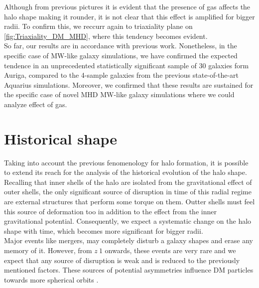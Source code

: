 Although from previous pictures it is evident that the presence of gas affects the halo shape making it rounder, it is not clear that this effect is amplified for bigger radii. To confirm this, we reccurr again to triaxiality plane on \ref{fig:Triaxiality_DM_MHD}, where this tendency becomes evident.\\


So far, our results are in accordance with previous work. Nonetheless, in the specific case of MW-like galaxy simulations, we have confirmed the expected tendence in an unprecedented statistically significant sample of 30 galaxies form Auriga, compared to the 4-sample galaxies from the previous state-of-the-art Aquarius simulations. Moreover, we confirmed that these results are sustained for the specific case of novel MHD MW-like galaxy simulations where we could analyze effect of gas.\\

\section{Historical shape}
Taking into account the previous fenomenology for halo formation, it is possible to extend 
its reach for the analysis of the historical evolution of the halo shape.\\

 Recalling that inner shells of the halo are isolated from the gravitational effect of outer shells, the only significant source of disruption in time of this radial regime are external structures that perform some torque on them. Outter shells must feel this source of deformation too in addition to the effect from the inner gravitational potential. Consequently, we expect a systematic change on the halo shape with time, which becomes more significant for bigger radii.\\
 
Major events like mergers, may completely disturb a galaxy shapes and erase any memory of it. However, from $z~1$ onwards, these events are very rare \cite{Tormen_et_al._1998} and we expect that any source of disruption is weak and is reduced to the previously mentioned factors. These sources of potential asymmetries influence DM particles towards more spherical orbits \cite{Debattista_et_al._2008}. \\  

